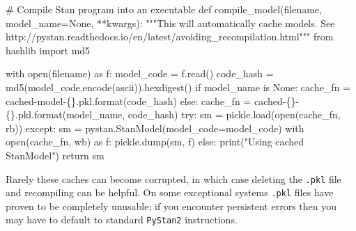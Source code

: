 \documentclass[
  letterpaper,
  DIV=11,
  numbers=noendperiod]{scrartcl}
\newenvironment{Shaded}{\begin{snugshade}}{\end{snugshade}}
\newcommand{\BuiltInTok}[1]{\textcolor[rgb]{0.00,0.23,0.31}{#1}}
\newcommand{\CommentTok}[1]{\textcolor[rgb]{0.37,0.37,0.37}{#1}}
\newcommand{\ControlFlowTok}[1]{\textcolor[rgb]{0.00,0.23,0.31}{#1}}
\newcommand{\ImportTok}[1]{\textcolor[rgb]{0.00,0.46,0.62}{#1}}
\newcommand{\KeywordTok}[1]{\textcolor[rgb]{0.00,0.23,0.31}{#1}}
\newcommand{\NormalTok}[1]{\textcolor[rgb]{0.00,0.23,0.31}{#1}}
\newcommand{\OperatorTok}[1]{\textcolor[rgb]{0.37,0.37,0.37}{#1}}
\newcommand{\SpecialCharTok}[1]{\textcolor[rgb]{0.37,0.37,0.37}{#1}}
\newcommand{\StringTok}[1]{\textcolor[rgb]{0.13,0.47,0.30}{#1}}
\newcommand{\VariableTok}[1]{\textcolor[rgb]{0.07,0.07,0.07}{#1}}
\begin{document}
\begin{Shaded}
\begin{Highlighting}[]
\CommentTok{\# Compile Stan program into an executable}
\KeywordTok{def}\NormalTok{ compile\_model(filename, model\_name}\OperatorTok{=}\VariableTok{None}\NormalTok{, }\OperatorTok{**}\NormalTok{kwargs):}
  \CommentTok{"""This will automatically cache models.}
\CommentTok{  }
\CommentTok{    See http://pystan.readthedocs.io/en/latest/avoiding\_recompilation.html"""}
  \ImportTok{from}\NormalTok{ hashlib }\ImportTok{import}\NormalTok{ md5}
  
  \ControlFlowTok{with} \BuiltInTok{open}\NormalTok{(filename) }\ImportTok{as}\NormalTok{ f:}
\NormalTok{    model\_code }\OperatorTok{=}\NormalTok{ f.read()}
\NormalTok{    code\_hash }\OperatorTok{=}\NormalTok{ md5(model\_code.encode(}\StringTok{\textquotesingle{}ascii\textquotesingle{}}\NormalTok{)).hexdigest()}
    \ControlFlowTok{if}\NormalTok{ model\_name }\KeywordTok{is} \VariableTok{None}\NormalTok{:}
\NormalTok{      cache\_fn }\OperatorTok{=} \StringTok{\textquotesingle{}cached{-}model{-}}\SpecialCharTok{\{\}}\StringTok{.pkl\textquotesingle{}}\NormalTok{.}\BuiltInTok{format}\NormalTok{(code\_hash)}
    \ControlFlowTok{else}\NormalTok{:}
\NormalTok{      cache\_fn }\OperatorTok{=} \StringTok{\textquotesingle{}cached{-}}\SpecialCharTok{\{\}}\StringTok{{-}}\SpecialCharTok{\{\}}\StringTok{.pkl\textquotesingle{}}\NormalTok{.}\BuiltInTok{format}\NormalTok{(model\_name, code\_hash) }
    \ControlFlowTok{try}\NormalTok{:}
\NormalTok{      sm }\OperatorTok{=}\NormalTok{ pickle.load(}\BuiltInTok{open}\NormalTok{(cache\_fn, }\StringTok{\textquotesingle{}rb\textquotesingle{}}\NormalTok{))}
    \ControlFlowTok{except}\NormalTok{:}
\NormalTok{      sm }\OperatorTok{=}\NormalTok{ pystan.StanModel(model\_code}\OperatorTok{=}\NormalTok{model\_code)}
      \ControlFlowTok{with} \BuiltInTok{open}\NormalTok{(cache\_fn, }\StringTok{\textquotesingle{}wb\textquotesingle{}}\NormalTok{) }\ImportTok{as}\NormalTok{ f:}
\NormalTok{        pickle.dump(sm, f)}
    \ControlFlowTok{else}\NormalTok{:}
       \BuiltInTok{print}\NormalTok{(}\StringTok{"Using cached StanModel"}\NormalTok{)}
    \ControlFlowTok{return}\NormalTok{ sm}
\end{Highlighting}
\end{Shaded}

Rarely these caches can become corrupted, in which case deleting the
\texttt{.pkl} file and recompiling can be helpful. On some exceptional
systems \texttt{.pkl} files have proven to be completely unusable; if
you encounter persistent errors then you may have to default to standard
\texttt{PyStan2} instructions.
\end{document}
